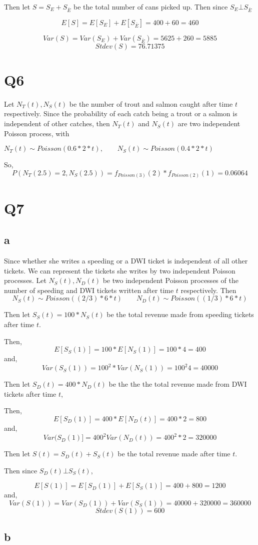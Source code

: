 \documentclass{article}
\begin{document}
Then let $S = S_E + S_{\bar E}$ be the total number of cans picked up.
Then since $S_E \bot S_{\bar E}$

$$
E[S] = E[S_E] + E[S_{\bar E}] = 400 + 60 = 460
$$

$$
Var(S) = Var(S_E) + Var(S_{\bar E}) = 5625 + 260 = 5885
$$
$$
Stdev(S) = 76.71375
$$

\section*{Q6}
Let $N_T(t), N_S(t) $ be the number of trout and salmon caught after time $t$ respectively. Since the probability of each catch being a trout or a salmon is independent of other catches, then $N_T(t)$ and $N_S(t)$ are two independent Poisson process, with 

$N_T(t) \sim Poisson(0.6 * 2 * t), \qquad N_S(t) \sim Poisson(0.4 * 2 * t)$

So, 
$$
P(N_T(2.5) = 2, N_S(2.5)) = f_{Poisson(3)}(2)*f_{Poisson(2)}(1) = 0.06064
$$

\section*{Q7}
\subsection*{a}
Since whether she writes a speeding or a DWI ticket is independent of all other tickets. We can represent the tickets she writes by two independent Poisson processes. 
Let $N_{S}(t), N_{D}(t)$ be two independent Poisson processes of the number of speeding and DWI tickets written after time $t$ respectively. 
Then
$$
N_S(t) \sim Poisson((2/3) * 6 * t) \qquad N_D(t) \sim Poisson((1/3) * 6 * t)
$$  

Then let $S_S(t) = 100 * N_S(t)$ be the total revenue made from speeding tickets after time $t$. 

Then, 
$$E[S_S(1)] = 100 * E[N_S(1)] = 100 * 4 = 400$$
and,
$$Var(S_S(1)) = 100^2 * Var(N_S(1)) = 100^2 4 = 40000
$$

Then let $S_D(t) = 400 * N_D(t)$ be the the the total revenue made from DWI tickets after time $t$,

Then,
$$
E[S_D(1)] = 400 * E[N_D(t)] = 400 *2 = 800
$$
and,
$$
Var(S_D(1)] = 400^2 Var(N_D(t)) = 400^2 * 2 = 320000
$$

Then let $S(t) = S_D(t) + S_S(t)$ be the total revenue made after time $t$.

Then since $S_D(t) \bot S_S(t)$,

$$
E[S(1)] = E[S_D(1)] + E[S_S(1)] = 400 + 800 = 1200
$$
and,
$$
Var(S(1)) = Var(S_D(1)) + Var(S_S(1)) =  40000 + 320000 = 360000
$$
$$
Stdev(S(1)) = 600
$$

\subsection*{b}
\end{document}
